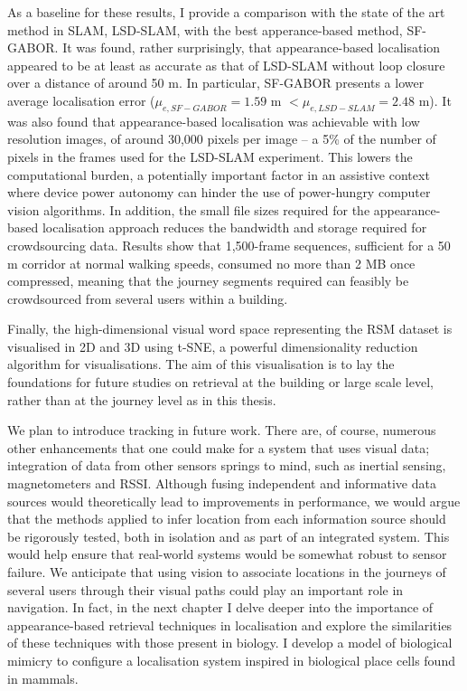 As a baseline for these results, I provide a comparison with the state of the art method in SLAM, LSD-SLAM, with the best apperance-based method, SF-GABOR. It was found, rather surprisingly, that appearance-based localisation appeared to be at least as accurate as that of LSD-SLAM without loop closure over a distance of around 50 m. In particular, SF-GABOR presents a lower average localisation error ($\mu_{e,SF-GABOR} = 1.59 $ m $< \mu_{e,LSD-SLAM} = 2.48 $ m). It was also found that a\-ppea\-rance\--based localisation was achievable with low resolution images, of around 30,000 pixels per image -- a 5\% of the number of pixels in the frames used for the LSD-SLAM experiment. This lowers the computational burden, a potentially important factor in an assistive context where device power autonomy can hinder the use of power-hungry computer vision algorithms. In addition, the small file sizes required for the appearance-based localisation approach reduces the bandwidth and storage required for crowdsourcing data. Results show that 1,500-frame sequences, sufficient for a 50 m corridor at normal walking speeds, consumed no more than 2 MB once compressed, meaning that the journey segments required can feasibly be crowdsourced from several users within a building.

Finally, the high-dimensional visual word space representing the RSM dataset is visualised in 2D and 3D using t-SNE, a powerful dimensionality reduction algorithm for visualisations. The aim of this visualisation is to lay the foundations for future studies on retrieval at the building or large scale level, rather than at the journey level as in this thesis.

We plan to introduce tracking in future work. There are, of course, numerous other enhancements that one could make for a system that uses visual data; integration of data from other sensors springs to mind, such as inertial sensing, magnetometers and RSSI.  Although fusing independent and informative data sources would theoretically lead to improvements in performance, we would argue that the methods applied to infer location from each information source should be rigorously tested, both in isolation and as part of an integrated system.  This would help ensure that real-world systems would be somewhat robust to sensor failure. We anticipate that using vision to associate locations in the journeys of several users through their visual paths could play an important role in navigation. In fact, in the next chapter I delve deeper into the importance of appearance-based retrieval techniques in localisation and explore the similarities of these techniques with those present in biology. I develop a model of biological mimicry to configure a localisation system inspired in biological place cells found in mammals.


\label{sec:conclusion}


